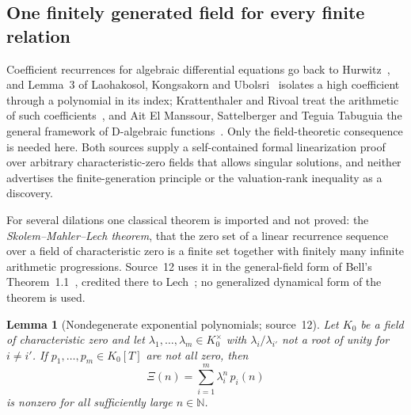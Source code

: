 \documentclass[11pt]{article}
\numberwithin{equation}{section}
\newtheorem{lemma}[theorem]{Lemma}
\theoremstyle{definition}
\theoremstyle{remark}
\newcommand{\N}{\mathbb N}
\begin{document}
\subsection{One finitely generated field for every finite relation}
\label{hol:cf:sub:coefficients}

Coefficient recurrences for algebraic differential equations go back to
Hurwitz~\cite{hurwitz}, and Lemma~3 of Laohakosol, Kongsakorn and
Ubolsri~\cite{lku} isolates a high coefficient through a polynomial in its
index; Krattenthaler and Rivoal treat the arithmetic of such
coefficients~\cite{kr}, and Ait El Manssour, Sattelberger and Teguia Tabuguia
the general framework of D-algebraic functions~\cite{ast}. Only the
field-theoretic consequence is needed here. Both sources supply a
self-contained formal linearization proof over arbitrary characteristic-zero
fields that allows singular solutions, and neither advertises the
finite-generation principle or the valuation-rank inequality as a discovery.

For several dilations one classical theorem is imported and not proved: the
\emph{Skolem--Mahler--Lech theorem}, that the zero set of a linear recurrence
sequence over a field of characteristic zero is a finite set together with
finitely many infinite arithmetic progressions. Source~12 uses it in the
general-field form of Bell's Theorem~1.1~\cite{bell}, credited there to
Lech~\cite{lech}; no generalized dynamical form of the theorem is used.

\begin{lemma}[Nondegenerate exponential polynomials; source~12]
\label{hol:cf:lem:exppoly}
Let $K_0$ be a field of characteristic zero and let
$\lambda_1,\ldots,\lambda_m\in K_0^\times$ with $\lambda_i/\lambda_{i'}$ not a
root of unity for $i\ne i'$. If $p_1,\ldots,p_m\in K_0[T]$ are not all zero,
then
\begin{equation}\label{hol:cf:eq:exppoly}
 \Xi(n)=\sum_{i=1}^m\lambda_i^n\,p_i(n)
\end{equation}
is nonzero for all sufficiently large $n\in\N$.
\end{lemma}
\end{document}
